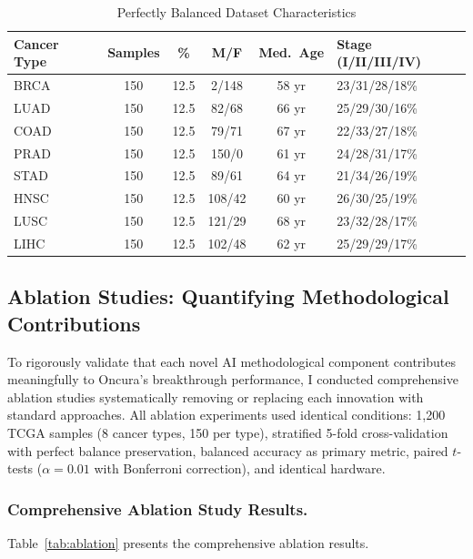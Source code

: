 \documentclass[manuscript, screen, review]{jair}
\begin{document}
\begin{table}[!t]
  \caption{Perfectly Balanced Dataset Characteristics}
  \label{tab:dataset}
  \centering
  \small
  \begin{tabular}{lccccl}
    \toprule
    Cancer Type & Samples & \% & M/F & Med.\ Age & Stage (I/II/III/IV) \\
    \midrule
    BRCA & 150 & 12.5 & 2/148   & 58 yr & 23/31/28/18\% \\
    LUAD & 150 & 12.5 & 82/68   & 66 yr & 25/29/30/16\% \\
    COAD & 150 & 12.5 & 79/71   & 67 yr & 22/33/27/18\% \\
    PRAD & 150 & 12.5 & 150/0   & 61 yr & 24/28/31/17\% \\
    STAD & 150 & 12.5 & 89/61   & 64 yr & 21/34/26/19\% \\
    HNSC & 150 & 12.5 & 108/42  & 60 yr & 26/30/25/19\% \\
    LUSC & 150 & 12.5 & 121/29  & 68 yr & 23/32/28/17\% \\
    LIHC & 150 & 12.5 & 102/48  & 62 yr & 25/29/29/17\% \\
    \bottomrule
  \end{tabular}
\end{table}

\subsection{Ablation Studies: Quantifying Methodological Contributions}
\label{sec:ablation}

To rigorously validate that each novel AI methodological component contributes meaningfully to Oncura's breakthrough performance, I conducted comprehensive ablation studies systematically removing or replacing each innovation with standard approaches. All ablation experiments used identical conditions: 1,200 TCGA samples (8 cancer types, 150 per type), stratified 5-fold cross-validation with perfect balance preservation, balanced accuracy as primary metric, paired $t$-tests ($\alpha=0.01$ with Bonferroni correction), and identical hardware.

\subsubsection{Comprehensive Ablation Study Results.}

Table~\ref{tab:ablation} presents the comprehensive ablation results.
\end{document}
